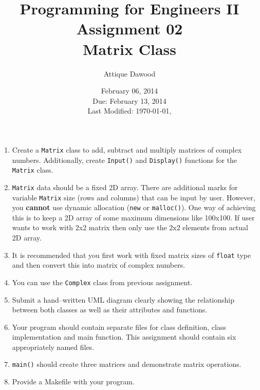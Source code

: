 \documentclass[12pt,a4paper]{article}
\title{\vspace{-3cm}Programming for Engineers II\\Assignment 02\\Matrix Class}
\author{Attique Dawood}
\date{February 06, 2014\\Due: February 13, 2014\\[0.2cm] Last Modified: \today, \currenttime}
\begin{document}
\maketitle
\begin{enumerate}
\item Create a \verb|Matrix| class to add, subtract and multiply matrices of complex numbers. Additionally, create \verb|Input()| and \verb|Display()| functions for the \verb|Matrix| class.
\item \verb|Matrix| data should be a fixed 2D array. There are additional marks for variable \verb|Matrix| size (rows and columns) that can be input by user. However, you \textbf{cannot} use dynamic allocation (\verb|new| or \verb|malloc()|). One way of achieving this is to keep a 2D array of some maximum dimensions like 100x100. If user wants to work with 2x2 matrix then only use the 2x2 elements from actual 2D array.
\item It is recommended that you first work with fixed matrix sizes of \verb|float| type and then convert this into matrix of complex numbers.
\item You can use the \verb|Complex| class from previous assignment.
\item Submit a hand--written UML diagram clearly showing the relationship between both classes as well as their attributes and functions.
\item Your program should contain separate files for class definition, class implementation and main function. This assignment should contain six appropriately named files.
\item \verb|main()| should create three matrices and demonstrate matrix operations.
\item Provide a Makefile with your program.
\end{enumerate}
\end{document}
